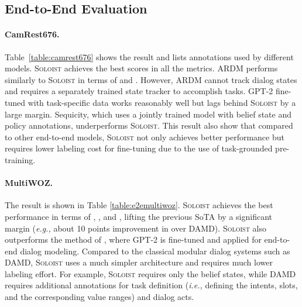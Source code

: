\documentclass[11pt,a4paper]{article}
\newcommand{\ie}[0]{\emph{i.e., }}
\newcommand{\eg}[0]{\emph{e.g., }}
\newcommand{\model}{\textsc{Soloist}}
\begin{document}
\subsection{End-to-End Evaluation}

\paragraph{CamRest676.} 
Table~\ref{table:camrest676} shows the result and lists annotations used by different models. 
\model{} achieves the best scores in all the metrics. 
ARDM performs similarly to \model{} in terms of  and . However, ARDM cannot track dialog states and requires a separately trained state tracker to accomplish tasks. GPT-2 fine-tuned with task-specific data works reasonably well but lags behind \model{} by a large margin. 
Sequicity, which uses a jointly trained model with belief state and policy annotations, underperforms \model{}. 
This result also show that compared to other end-to-end models, \model{} not only achieves better performance but requires lower labeling cost for fine-tuning
due to the use of task-grounded pre-training.

\paragraph{MultiWOZ.}  
The result is shown in Table \ref{table:e2emultiwoz}. 
\model{} achieves the best performance in terms of , , and , lifting the previous SoTA by a significant margin (\eg about 10 points improvement in  over DAMD). 
\model{} also outperforms the method of \citet{Ham2020e2e}, where GPT-2 is fine-tuned and applied for end-to-end dialog modeling.
Compared to the classical modular dialog systems such as 
DAMD, \model{} uses a much simpler architecture and requires much lower labeling effort. 
For example, \model{} requires only the belief states, while DAMD requires additional annotations for task definition (\ie defining the intents, slots, and the corresponding value ranges) and dialog acts. 

\begin{table}[t!]
    \centering
    \scriptsize
{}
    \caption{Data statistics for domains used  in few-shot evaluation. \texttt{Attra.} denotes \texttt{Attraction} domain and \texttt{Rest.} means \texttt{Restaurant}.}
    \label{table:fewshotdataset}
\end{table}
\end{document}
